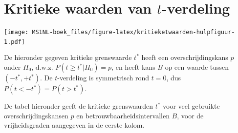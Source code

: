 \documentclass[
]{book}
\begin{document}
\hypertarget{app:kritieketwaarden}{%
\chapter{\texorpdfstring{Kritieke waarden van \(t\)-verdeling}{Kritieke waarden van t-verdeling}}\label{app:kritieketwaarden}}

\texttt{[image: MS1NL-boek\_files/figure-latex/kritieketwaarden-hulpfiguur-1.pdf]}

De hieronder gegeven kritieke grenswaarde \(t^*\) heeft een overschrijdingskans \(p\)
onder \(H_0\), d.w.z. \(P(t \geq t^*|H_0)=p\), en heeft kans \(B\) op een
waarde tussen \((-t^*, +t^*)\). De \(t\)-verdeling is symmetrisch rond
\(t=0\), dus \(P(t < -t^*) = P(t > t^*)\).

De tabel hieronder geeft de kritieke grenswaarden \(t^*\) voor veel gebruikte overschrijdingskansen \(p\) en betrouwbaarheidsintervallen \(B\), voor de vrijheidsgraden aangegeven in de eerste kolom.
\end{document}
